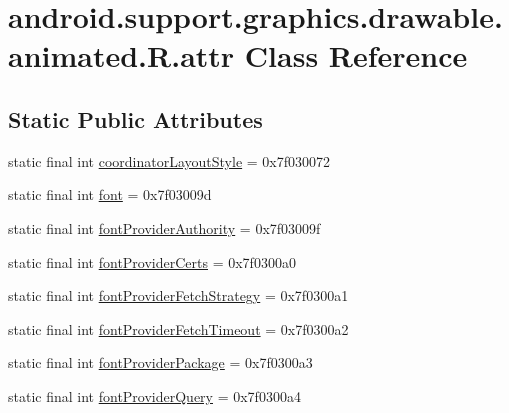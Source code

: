 \hypertarget{classandroid_1_1support_1_1graphics_1_1drawable_1_1animated_1_1_r_1_1attr}{}\section{android.\+support.\+graphics.\+drawable.\+animated.\+R.\+attr Class Reference}
\label{classandroid_1_1support_1_1graphics_1_1drawable_1_1animated_1_1_r_1_1attr}
\subsection*{Static Public Attributes}
\begin{DoxyCompactItemize}
\item 
static final int \mbox{\hyperlink{classandroid_1_1support_1_1graphics_1_1drawable_1_1animated_1_1_r_1_1attr_af38373f41a300bc0b881b77633fb77a4}{coordinator\+Layout\+Style}} = 0x7f030072
\item 
static final int \mbox{\hyperlink{classandroid_1_1support_1_1graphics_1_1drawable_1_1animated_1_1_r_1_1attr_a99643e2009ec47a9271f6768a14ddd2c}{font}} = 0x7f03009d
\item 
static final int \mbox{\hyperlink{classandroid_1_1support_1_1graphics_1_1drawable_1_1animated_1_1_r_1_1attr_a0f49b981a4f1da3992f45f3dddcf75e6}{font\+Provider\+Authority}} = 0x7f03009f
\item 
static final int \mbox{\hyperlink{classandroid_1_1support_1_1graphics_1_1drawable_1_1animated_1_1_r_1_1attr_aa2bd06656aa0be203dc5d1762a0aba5b}{font\+Provider\+Certs}} = 0x7f0300a0
\item 
static final int \mbox{\hyperlink{classandroid_1_1support_1_1graphics_1_1drawable_1_1animated_1_1_r_1_1attr_a24355d3cf894fc917604f9f4f5ad7eba}{font\+Provider\+Fetch\+Strategy}} = 0x7f0300a1
\item 
static final int \mbox{\hyperlink{classandroid_1_1support_1_1graphics_1_1drawable_1_1animated_1_1_r_1_1attr_a5f3c97df0c305c2ffe21fd56eb225179}{font\+Provider\+Fetch\+Timeout}} = 0x7f0300a2
\item 
static final int \mbox{\hyperlink{classandroid_1_1support_1_1graphics_1_1drawable_1_1animated_1_1_r_1_1attr_a01be735f06dd63dca7f73e660f227080}{font\+Provider\+Package}} = 0x7f0300a3
\item 
static final int \mbox{\hyperlink{classandroid_1_1support_1_1graphics_1_1drawable_1_1animated_1_1_r_1_1attr_a141e0e2796b6865a43d75420d4a7d625}{font\+Provider\+Query}} = 0x7f0300a4

\end{DoxyCompactItemize}
